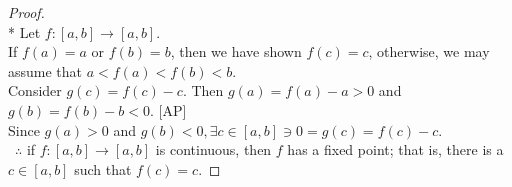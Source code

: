 \documentclass[a4paper]{article}
\begin{document}
\begin{flushleft}
\begin{enumerate}[a.]
            \begin{proof}\mbox{}\\*
                Let $f: [a,b] \to [a,b]$. \\
                If $f(a)=a$ or $f(b)=b$, then we have shown $f(c)=c$, otherwise, we may assume that $a<f(a) < f(b) < b$. \\
                Consider $g(c) = f(c) - c$. Then $g(a) = f(a)-a > 0$ and $g(b) = f(b)-b < 0$.    [AP]\\
                Since $g(a) > 0$ and $g(b) < 0, \exists c\in[a,b]\ni 0 = g(c) = f(c) - c$. \\\
                $\therefore$ if $f : [a, b] \to [a, b]$ is continuous, then $f$ has a fixed point; that is, there is a $c \in [a, b]$ such that $f(c) = c$.
            \end{proof}

        \end{enumerate} 

    \end{flushleft}
\end{document}

